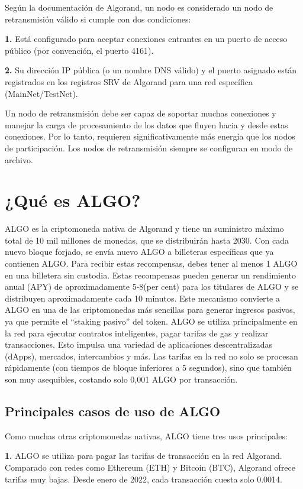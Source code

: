 \documentclass{article}
\begin{document}
Según la documentación de Algorand, un nodo es considerado un nodo de retransmisión válido si cumple con dos condiciones:


\textbf{1. }Está configurado para aceptar conexiones entrantes en un puerto de acceso público (por convención, el puerto 4161).

\textbf{2. }Su dirección IP pública (o un nombre DNS válido) y el puerto asignado están registrados en los registros SRV de Algorand para una red específica (MainNet/TestNet).

Un nodo de retransmisión debe ser capaz de soportar muchas conexiones y manejar la carga de procesamiento de los datos que fluyen hacia y desde estas conexiones. Por lo tanto, requieren significativamente más energía que los nodos de participación. Los nodos de retransmisión siempre se configuran en modo de archivo.


\section{¿Qué es ALGO?}

ALGO es la criptomoneda nativa de Algorand y tiene un suministro máximo total de 10 mil millones de monedas, que se distribuirán hasta 2030. Con cada nuevo bloque forjado, se envía nuevo ALGO a billeteras específicas que ya contienen ALGO. Para recibir estas recompensas, debes tener al menos 1 ALGO en una billetera sin custodia. Estas recompensas pueden generar un rendimiento anual (APY) de aproximadamente 5-8(per cent) para los titulares de ALGO y se distribuyen aproximadamente cada 10 minutos. Este mecanismo convierte a ALGO en una de las criptomonedas más sencillas para generar ingresos pasivos, ya que permite el “staking pasivo” del token.
ALGO se utiliza principalmente en la red para ejecutar contratos inteligentes, pagar tarifas de gas y realizar transacciones. Esto impulsa una variedad de aplicaciones descentralizadas (dApps), mercados, intercambios y más. Las tarifas en la red no solo se procesan rápidamente (con tiempos de bloque inferiores a 5 segundos), sino que también son muy asequibles, costando solo 0,001 ALGO por transacción.

\subsection{Principales casos de uso de ALGO}

Como muchas otras criptomonedas nativas, ALGO tiene tres usos principales:

\textbf{1. }ALGO se utiliza para pagar las tarifas de transacción en la red Algorand. Comparado con redes como Ethereum (ETH) y Bitcoin (BTC), Algorand ofrece tarifas muy bajas. Desde enero de 2022, cada transacción cuesta solo 0.0014.
\end{document}
